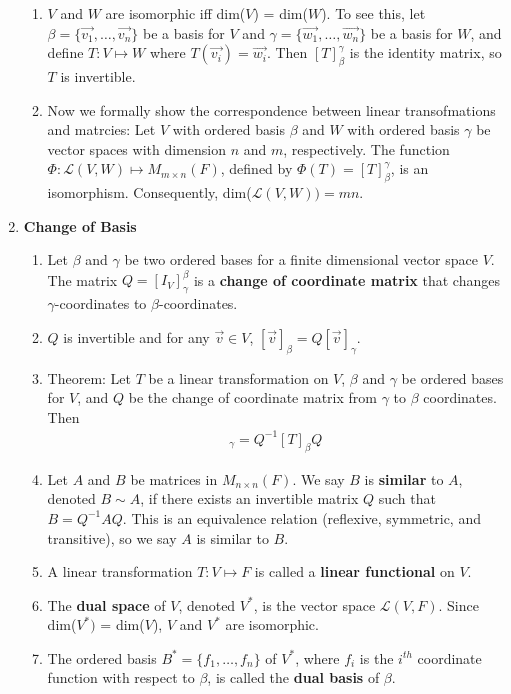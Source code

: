 \documentclass[10pt]{article}
\begin{document}
\begin{multicols*}{2}
\begin{enumerate}
\begin{enumerate}
        \item $V$ and $W$ are isomorphic iff dim($V$) = dim($W$). To see this, let $\beta = \{\vec{v_1}, \hdots, \vec{v_n}\}$ be a basis for $V$ and $\gamma = \{\vec{w_1}, \hdots, \vec{w_n}\}$ be a basis for $W$, and define $T: V \mapsto W$ where $T(\vec{v_i}) = \vec{w_i}$. Then $[T]_\beta^\gamma$ is the identity matrix, so $T$ is invertible.
        
        \item Now we formally show the correspondence between linear transofmations and matrcies: Let $V$ with ordered basis $\beta$ and $W$ with ordered basis $\gamma$ be vector spaces with dimension $n$ and $m$, respectively. The function $\Phi : \mathcal{L}(V,W) \mapsto M_{m \times n}(F)$, defined by $\Phi(T) = [T]_\beta^\gamma$, is an isomorphism. Consequently, dim($\mathcal{L}(V,W)) = mn$.
    \end{enumerate}
    
    \item \textbf{Change of Basis}
    \begin{enumerate}
        \item Let $\beta$ and $\gamma$ be two ordered bases for a finite dimensional vector space $V$. The matrix $Q = [I_V]_\gamma^\beta$ is a \textbf{change of coordinate matrix} that changes $\gamma$-coordinates to $\beta$-coordinates.
        \item $Q$ is invertible and for any $\vec{v} \in V$, $[\vec{v}]_\beta = Q[\vec{v}]_\gamma$. 
        \item Theorem: Let $T$ be a linear transformation on $V$, $\beta$ and $\gamma$ be ordered bases for $V$, and $Q$ be the change of coordinate matrix from $\gamma$ to $\beta$ coordinates. Then
        \begin{align*}
            [T]_\gamma = Q^{-1}[T]_\beta Q
        \end{align*}
        \item Let $A$ and $B$ be matrices in $M_{n \times n}(F)$. We say $B$ is \textbf{similar} to $A$, denoted $B \sim A$, if there exists an invertible matrix $Q$ such that $B = Q^{-1}AQ$. This is an equivalence relation (reflexive, symmetric, and transitive), so we say $A$ is similar to $B$.
        \item A linear transformation $T:V \mapsto F$ is called a \textbf{linear functional} on $V$.
        \item The \textbf{dual space} of $V$, denoted $V^*$, is the vector space $\mathcal{L}(V,F)$. Since dim($V^*)$ = dim($V$), $V$ and $V^*$ are isomorphic.
        \item The ordered basis $B^* = \{f_1, \hdots, f_n \}$ of $V^*$, where $f_i$ is the $i^{th}$ coordinate function with respect to $\beta$, is called the \textbf{dual basis} of $\beta$.
    \end{enumerate}
    

\end{enumerate}
\end{multicols*}
\end{document}
